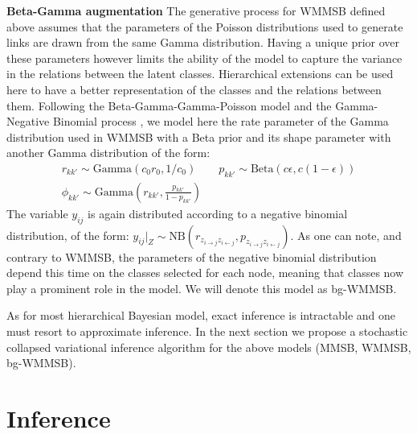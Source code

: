 \textbf{Beta-Gamma augmentation} The generative process for WMMSB defined above assumes that the parameters of the Poisson distributions used to generate links are drawn from the same Gamma distribution. Having a unique prior over these parameters however limits the ability of the model to capture the variance in the relations between the latent classes. Hierarchical extensions can be used here to have a better representation of the classes and the relations between them. Following the Beta-Gamma-Gamma-Poisson model \cite{zhou2012beta} and the Gamma-Negative Binomial process \cite{zhou2015negative}, we model here the rate parameter of the Gamma distribution used in WMMSB with a Beta prior and its shape parameter with another Gamma distribution of the form:
%
\begin{gather*}
r_{kk'} \sim \textrm{Gamma}(c_0r_0, 1/c_0) \qquad p_{kk'} \sim \textrm{Beta}(c\epsilon, c(1-\epsilon)) \\
\phi_{kk'} \sim \textrm{Gamma}(r_{kk'}, \frac{p_{kk'}}{1-p_{kk'}})
\end{gather*}
%
The variable $y_{ij}$ is again distributed according to a negative binomial distribution, of the form: $y_{ij}|_{Z} \sim \textrm{NB}(r_{z_{i \rightarrow j} z_{i \leftarrow j}},p_{z_{i \rightarrow j} z_{i \leftarrow j}})$. As one can note, and contrary to WMMSB, the parameters of the negative binomial distribution depend this time on the classes selected for each node, meaning that classes now play a prominent role in the model. We will denote this model as bg-WMMSB.

As for most hierarchical Bayesian model, exact inference is intractable and one must resort to approximate inference. In the next section we propose a stochastic collapsed variational inference algorithm for the above models (MMSB, WMMSB, bg-WMMSB).

\section{Inference}
\label{sec:inference}

